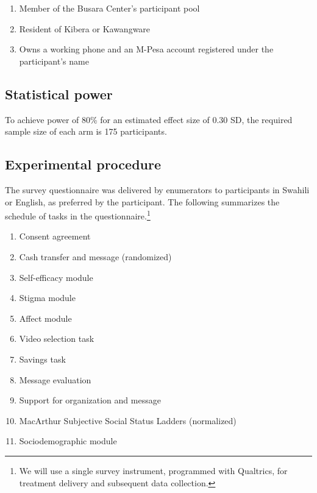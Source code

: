 \documentclass[11pt, a4paper]{article}\usepackage[]{graphicx}\usepackage[]{color}
\begin{document}
        \begin{enumerate}
        \itemsep0em
            \item Member of the Busara Center's participant pool
            \item Resident of Kibera or Kawangware
            \item Owns a working phone and an M-Pesa account registered under the participant's name
        \end{enumerate}

    \subsection{Statistical power}

        To achieve power of 80\% for an estimated effect size of 0.30 SD, the required sample size of each arm is 175 participants.

    \subsection{Experimental procedure}

        The survey questionnaire was delivered by enumerators to participants in Swahili or English, as preferred by the participant. The following summarizes the schedule of tasks in the questionnaire.\footnote{We will use a single survey instrument, programmed with Qualtrics, for treatment delivery and subsequent data collection.}

        \begin{enumerate}
        \itemsep0em
            \item Consent agreement
            \item Cash transfer and message (randomized)
            \item Self-efficacy module
            \item Stigma module
            \item Affect module
            \item Video selection task
            \item Savings task
            \item Message evaluation
            \item Support for organization and message
            \item MacArthur Subjective Social Status Ladders (normalized)
            \item Sociodemographic module
        \end{enumerate}
\end{document}
